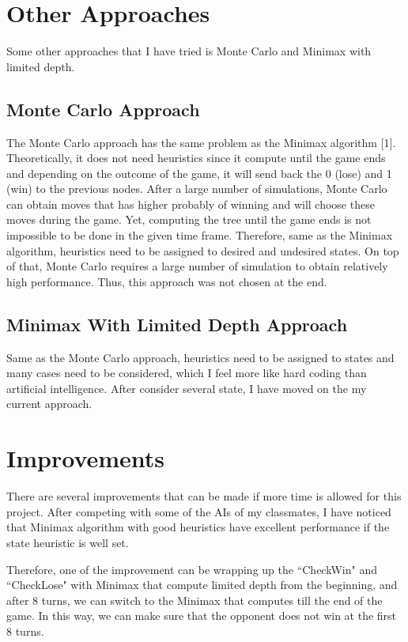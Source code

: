 \documentclass[a4paper,titlepage]{article}
\begin{document}
\section{Other Approaches}
Some other approaches that I have tried is Monte Carlo and Minimax with limited depth. 

\subsection{\small{Monte Carlo Approach}}
The Monte Carlo approach has the same problem as the Minimax algorithm [1]. Theoretically, it does not need heuristics since it compute until the game ends and depending on the outcome of the game, it will send back the 0 (lose) and 1 (win) to the previous nodes. After a large number of simulations, Monte Carlo can obtain moves that has higher probably of winning and will choose these moves during the game. Yet, computing the tree until the game ends is not impossible to be done in the given time frame. Therefore, same as the Minimax algorithm, heuristics need to be assigned to desired and undesired states. On top of that, Monte Carlo requires a large number of simulation to obtain relatively high performance. Thus, this approach was not chosen at the end.

\subsection{\small{Minimax With Limited Depth Approach}}
Same as the Monte Carlo approach, heuristics need to be assigned to states and many cases need to be considered, which I feel more like hard coding than artificial intelligence. After consider several state, I have moved on the my current approach.

\section{Improvements}
There are several improvements that can be made if more time is allowed for this project. After competing with some of the AIs of my classmates, I have noticed that Minimax algorithm with good heuristics have excellent performance if the state heuristic is well set. 

Therefore, one of the improvement can be wrapping up the ``CheckWin" and ``CheckLose" with Minimax that compute limited depth from the beginning, and after 8 turns, we can switch to the Minimax that computes till the end of the game. In this way, we can make sure that the opponent does not win at the first 8 turns.
\end{document}

